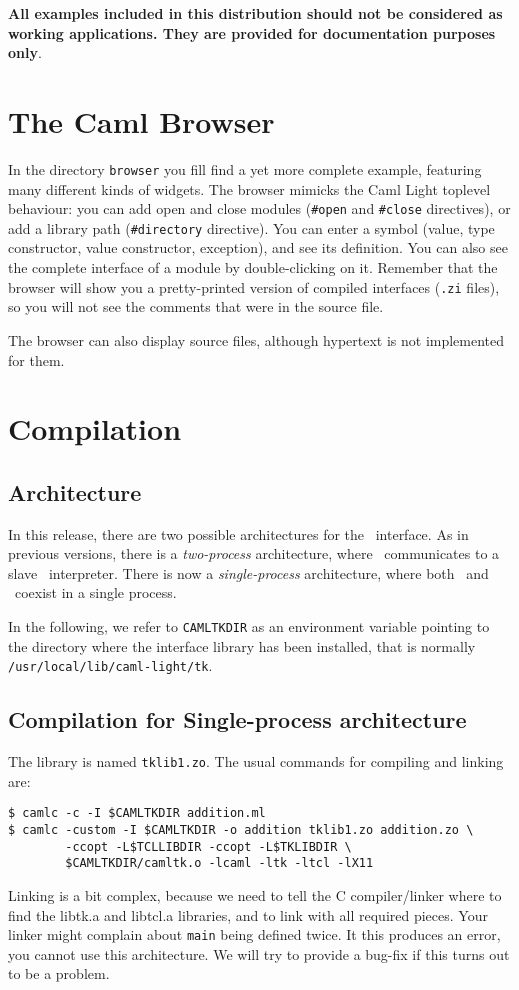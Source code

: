 {\bf All examples included in this distribution  should not be considered as
working applications. They are provided for documentation purposes only}.

\section{The Caml Browser}
In the directory {\tt browser} you fill find a yet more complete example,
featuring many different kinds of widgets. The browser mimicks the Caml
Light toplevel behaviour: you can add open and close modules ({\tt \#open} and
{\tt \#close} directives), or add a library path ({\tt \#directory} directive).
You can enter a symbol (value, type constructor, value constructor,
exception), and see its definition. You can also see the complete interface
of a module by double-clicking on it. 
Remember that the browser will show you a pretty-printed version
of compiled interfaces ({\tt .zi} files), so you will not see the comments
that were in the source file.

The browser can also display source files, although hypertext is not
implemented for them.

\section{Compilation}
\label{sec:compiling}
\subsection{Architecture}
In this release, there are two possible architectures for the \caml\tk\
interface. As in previous versions, there is a {\em two-process}
architecture, where \caml\ communicates to a slave \wish\ interpreter.
There is now a {\em single-process} architecture, where both \caml\ and \tk\
coexist in a single process.

In the following, we refer to \verb|CAMLTKDIR| as an environment variable
pointing to the directory where the interface library has been
installed, that is normally \verb|/usr/local/lib/caml-light/tk|.
\subsection{Compilation for Single-process architecture}
The library is named \verb|tklib1.zo|.
The usual commands for compiling and linking are:
\begin{verbatim}
$ camlc -c -I $CAMLTKDIR addition.ml
$ camlc -custom -I $CAMLTKDIR -o addition tklib1.zo addition.zo \
        -ccopt -L$TCLLIBDIR -ccopt -L$TKLIBDIR \
        $CAMLTKDIR/camltk.o -lcaml -ltk -ltcl -lX11
\end{verbatim}
Linking is a bit complex, because we need to tell the C compiler/linker
where to find the libtk.a and libtcl.a libraries, and to link with all
required pieces. Your linker might complain about \verb|main| being defined
twice. It this produces an error, you cannot use this architecture.
We will try to provide a bug-fix if this turns out to be a problem.


